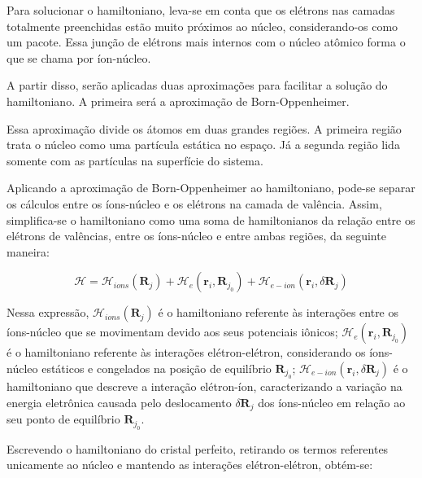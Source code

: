       \par Para solucionar o hamiltoniano, leva-se em conta que os elétrons nas camadas totalmente preenchidas estão muito próximos ao núcleo, considerando-os como um pacote. Essa junção de elétrons mais internos com o núcleo atômico forma o que se chama por íon-núcleo.
    
      \par A partir disso, serão aplicadas duas aproximações para facilitar a solução do hamiltoniano. A primeira será a aproximação de Born-Oppenheimer.\cite{qm_fis9}


      \par Essa aproximação divide os átomos em duas grandes regiões. A primeira região trata o núcleo como uma partícula estática no espaço. Já a segunda região lida somente com as partículas na superfície do sistema.

      \par Aplicando a aproximação de Born-Oppenheimer ao hamiltoniano, pode-se separar os cálculos entre os íons-núcleo e os elétrons na camada de valência. Assim, simplifica-se o hamiltoniano como uma soma de hamiltonianos da relação entre os elétrons de valências, entre os íons-núcleo e entre ambas regiões, da seguinte maneira:

      \begin{equation}\label{eq_schrodinger_eq5}
        \mathcal{H} = 
          \mathcal{H}_{ions} (\mathbf{R}_{j}) 
          + \mathcal{H}_{e}(\mathbf{r}_{i}, \mathbf{R}_{j_{0}})
          + \mathcal{H}_{e-ion}(\mathbf{r}_i, \delta\mathbf{R}_j)
      \end{equation}

      \par Nessa expressão, $\mathcal{H}_{ions}(\mathbf{R}_{j})$ é o hamiltoniano referente às interações entre os íons-núcleo que se movimentam devido aos seus potenciais iônicos; $\mathcal{H}_{e}(\mathbf{r}_{i},\mathbf{R}_{j_{0}})$ é o hamiltoniano referente às interações elétron-elétron, considerando os íons-núcleo estáticos e congelados na posição de equilíbrio $\mathbf{R}_{j_{0}}$; $\mathcal{H}_{e-ion}(\mathbf{r}_{i},\delta\mathbf{R}_{j})$ é o hamiltoniano que descreve a interação elétron-íon, caracterizando a variação na energia eletrônica causada pelo deslocamento $\delta\mathbf{R}_{j}$ dos íons-núcleo em relação ao seu ponto de equilíbrio $\mathbf{R}_{j_{0}}$.
      
      \par Escrevendo o hamiltoniano do cristal perfeito, retirando os termos referentes unicamente ao núcleo e mantendo as interações elétron-elétron, obtém-se:

